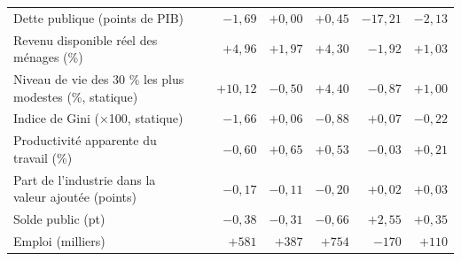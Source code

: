 \begin{tabular}{p{4.8cm}crrrrr}
Dette publique (points de PIB) & & $-1{,}69$ & $+0{,}00$ & $+0{,}45$ & $-17{,}21$ & $-2{,}13$\\
Revenu disponible réel des ménages (\%) & & $+4{,}96$ & $+1{,}97$ & $+4{,}30$ & $-1{,}92$ & $+1{,}03$\\
Niveau de vie des 30 \% les plus modestes (\%, statique) & & $+10{,}12$ & $-0{,}50$ & $+4{,}40$ & $-0{,}87$ & $+1{,}00$\\
Indice de Gini (×100, statique) & & $-1{,}66$ & $+0{,}06$ & $-0{,}88$ & $+0{,}07$ & $-0{,}22$\\
Productivité apparente du travail (\%) & & $-0{,}60$ & $+0{,}65$ & $+0{,}53$ & $-0{,}03$ & $+0{,}21$\\
Part de l'industrie dans la valeur ajoutée (points) & & $-0{,}17$ & $-0{,}11$ & $-0{,}20$ & $+0{,}02$ & $+0{,}03$\\
Solde public (pt) & & $-0{,}38$ & $-0{,}31$ & $-0{,}66$ & $+2{,}55$ & $+0{,}35$\\
Emploi (milliers) & & $+581$ & $+387$ & $+754$ & $-170$ & $+110$\\\bottomrule\end{tabular}
